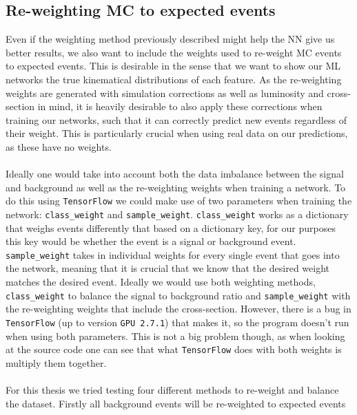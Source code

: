 \documentclass[12pt, a4paper]{book}
\begin{document}
\subsection{Re-weighting MC to expected events}\label{sec:sample_wgts_NN}
Even if the weighting method previously described might help the NN give us better results, we also want to include the weights used to re-weight MC events to expected events. This is desirable in the sense that we want to show our ML networks the true kinematical distributions of each feature.
As the re-weighting weights are generated with simulation corrections as well as luminosity and cross-section in mind, it is heavily desirable to also apply these corrections when training our networks, such that it can correctly predict new events regardless of their weight. This is particularly 
crucial when using real data on our predictions, as these have no weights.\\
\\Ideally one would take into account both the data imbalance between the signal and background as well as the re-weighting weights when training a network. To do this using \verb|TensorFlow| we could make use of two parameters when training the network: \verb|class_weight| and \verb|sample_weight|. 
\verb|class_weight| works as a dictionary that weighs events differently that based on a dictionary key, for our purposes this key would be whether the event is a signal or background event. 
\verb|sample_weight| takes in individual weights for every single event that goes into the network, meaning that it is crucial that we know that the desired weight matches the desired event. Ideally we would use both weighting methods, \verb|class_weight| to balance the signal to 
background ratio and \verb|sample_weight| with the re-weighting weights that include the cross-section. However, there is a bug in \verb|TensorFlow| (up to version \verb|GPU 2.7.1|) that makes it, so the program doesn't run when using both parameters. This is not a big problem though, as when looking at the source code \cite{Keras_source_code} 
one can see that what \verb|TensorFlow| does with both weights is multiply them together. \\
\\For this thesis we tried testing four different methods to re-weight and balance the dataset. Firstly all background events will be re-weighted to expected events%
\end{document}
